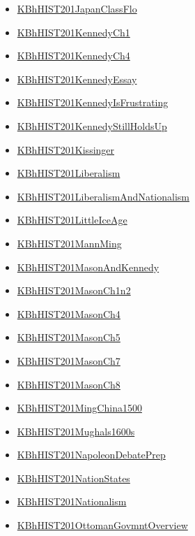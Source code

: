 \documentclass[11pt]{article}
\begin{document}
\begin{itemize}
\begin{itemize}
\item \href{hist201/KBhHIST201JapanClassFlo.org}{KBhHIST201JapanClassFlo}
\item \href{hist201/KBhHIST201KennedyCh1.org}{KBhHIST201KennedyCh1}
\item \href{hist201/KBhHIST201KennedyCh4.org}{KBhHIST201KennedyCh4}
\item \href{hist201/KBhHIST201KennedyEssay.org}{KBhHIST201KennedyEssay}
\item \href{hist201/KBhHIST201KennedyIsFrustrating.org}{KBhHIST201KennedyIsFrustrating}
\item \href{hist201/KBhHIST201KennedyStillHoldsUp.org}{KBhHIST201KennedyStillHoldsUp}
\item \href{hist201/KBhHIST201Kissinger.org}{KBhHIST201Kissinger}
\item \href{hist201/KBhHIST201Liberalism.org}{KBhHIST201Liberalism}
\item \href{hist201/KBhHIST201LiberalismAndNationalism.org}{KBhHIST201LiberalismAndNationalism}
\item \href{hist201/KBhHIST201LittleIceAge.org}{KBhHIST201LittleIceAge}
\item \href{hist201/KBhHIST201MannMing.org}{KBhHIST201MannMing}
\item \href{hist201/KBhHIST201MasonAndKennedy.org}{KBhHIST201MasonAndKennedy}
\item \href{hist201/KBhHIST201MasonCh1n2.org}{KBhHIST201MasonCh1n2}
\item \href{hist201/KBhHIST201MasonCh4.org}{KBhHIST201MasonCh4}
\item \href{hist201/KBhHIST201MasonCh5.org}{KBhHIST201MasonCh5}
\item \href{hist201/KBhHIST201MasonCh7.org}{KBhHIST201MasonCh7}
\item \href{hist201/KBhHIST201MasonCh8.org}{KBhHIST201MasonCh8}
\item \href{hist201/KBhHIST201MingChina1500.org}{KBhHIST201MingChina1500}
\item \href{hist201/KBhHIST201Mughals1600s.org}{KBhHIST201Mughals1600s}
\item \href{hist201/KBhHIST201NapoleonDebatePrep.org}{KBhHIST201NapoleonDebatePrep}
\item \href{hist201/KBhHIST201NationStates.org}{KBhHIST201NationStates}
\item \href{hist201/KBhHIST201Nationalism.org}{KBhHIST201Nationalism}
\item \href{hist201/KBhHIST201OttomanGovmntOverview.org}{KBhHIST201OttomanGovmntOverview}

\end{itemize}
\end{itemize}
\end{document}
